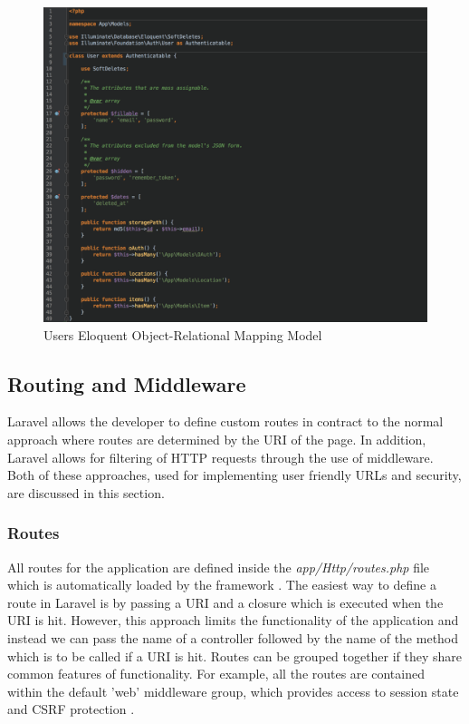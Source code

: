 \begin{figure}[H]
	\centering
	\includegraphics[width=1.0\textwidth]{images/Code/Model_User}
	\caption{Users Eloquent Object-Relational Mapping Model} \label{fig:Model_User}
\end{figure}

\subsection{Routing and Middleware}
Laravel allows the developer to define custom routes in contract to the normal approach where routes are determined by the URI of the page. In addition, Laravel allows for filtering of HTTP requests through the use of middleware. Both of these approaches, used for implementing user friendly URLs and security, are discussed in this section.

\subsubsection{Routes}
All routes for the application are defined inside the \emph{app/Http/routes.php} file which is automatically loaded by the framework \cite{Laravel:Routing}. The easiest way to define a route in Laravel is by passing a URI and a closure which is executed when the URI is hit. However, this approach limits the functionality of the application and instead we can pass the name of a controller followed by the name of the method which is to be called if a URI is hit. Routes can be grouped together if they share common features of functionality. For example, all the routes are contained within the default 'web' middleware group, which provides access to session state and CSRF protection \cite{Laravel:Routing}.

